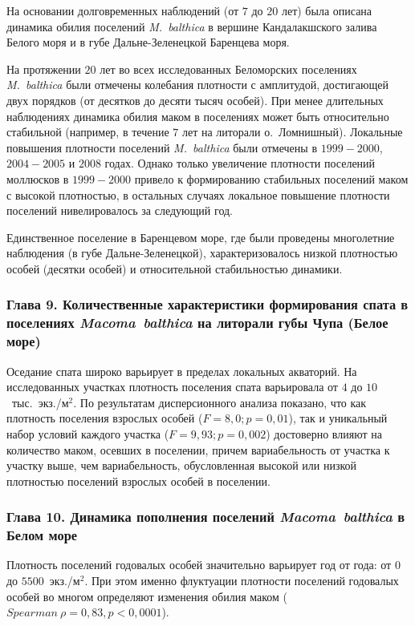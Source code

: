 {На основании долговременных наблюдений (от $7$ до $20$ лет) была описана динамика обилия поселений \textit{M.~balthica} в вершине Кандалакшского залива Белого моря и в губе Дальне-Зеленецкой Баренцева моря.

На протяжении $20$ лет во всех исследованных Беломорских поселениях \textit{M.~balthica} были отмечены колебания плотности с амплитудой, достигающей двух порядков (от десятков до десяти тысяч особей).
При менее длительных наблюдениях динамика обилия маком в поселениях может быть относительно стабильной (например, в течение $7$ лет на литорали о.~Ломнишный).
Локальные повышения плотности поселений \textit{M.~balthica} были отмечены в $1999-2000$, $2004-2005$ и $2008$ годах.
Однако только увеличение плотности поселений моллюсков в $1999-2000$ привело к формированию стабильных поселений маком с высокой плотностью, в остальных случаях локальное повышение плотности поселений нивелировалось за следующий год.

Единственное поселение в Баренцевом море, где были проведены многолетние наблюдения (в губе Дальне-Зеленецкой), характеризовалось низкой плотностью особей (десятки особей) и относительной стабильностью динамики. 

\subsubsection*{Глава 9. Количественные характеристики формирования спата в поселениях \textit{Macoma~balthica} на литорали губы Чупа (Белое море)} 

Оседание спата широко варьирует в пределах локальных акваторий.
На исследованных участках плотность поселения спата варьировала от $4$ до $10$~тыс.~экз./м$^2$.
По результатам дисперсионного анализа показано, что как плотность поселения взрослых особей ($F = 8,0; p = 0,01$), так и уникальный набор условий каждого участка ($F = 9,93; p = 0,002$) достоверно влияют на количество маком, осевших в поселении, причем вариабельность от участка к участку выше, чем вариабельность, обусловленная высокой или низкой плотностью поселений взрослых особей в поселении. 

\subsubsection*{Глава 10. Динамика пополнения поселений \textit{Macoma~balthica} в Белом море}

Плотность поселений годовалых особей значительно варьирует год от года: от $0$ до $5500$~экз./м$^2$.
При этом именно флуктуации плотности поселений годовалых особей во многом определяют изменения обилия маком ($Spearman\ \rho = 0,83, p < 0,0001$).

}
